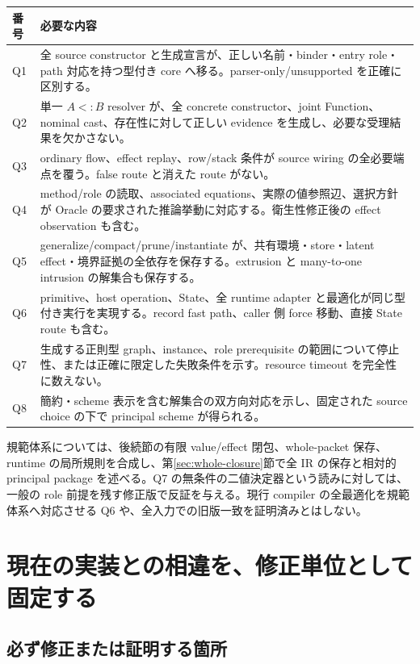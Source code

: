 \documentclass[11pt,a4paper]{article}
\theoremstyle{remark}
\begin{document}
\begin{longtable}{p{}p{}}
\toprule
番号 & 必要な内容 \\
\midrule\endhead
Q1 & 全 source constructor と生成宣言が、正しい名前・binder・entry role・path 対応を持つ型付き core へ移る。parser-only/unsupported を正確に区別する。\\
Q2 & 単一 $A<:B$ resolver が、全 concrete constructor、joint Function、nominal cast、存在性に対して正しい evidence を生成し、必要な受理結果を欠かさない。\\
Q3 & ordinary flow、effect replay、row/stack 条件が source wiring の全必要端点を覆う。false route と消えた route がない。\\
Q4 & method/role の読取、associated equations、実際の値参照辺、選択方針が Oracle の要求された推論挙動に対応する。衛生性修正後の effect observation も含む。\\
Q5 & generalize/compact/prune/instantiate が、共有環境・store・latent effect・境界証拠の全依存を保存する。extrusion と many-to-one intrusion の解集合も保存する。\\
Q6 & primitive、host operation、State、全 runtime adapter と最適化が同じ型付き実行を実現する。record fast path、caller 側 force 移動、直接 State route も含む。\\
Q7 & 生成する正則型 graph、instance、role prerequisite の範囲について停止性、または正確に限定した失敗条件を示す。resource timeout を完全性に数えない。\\
Q8 & 簡約・scheme 表示を含む解集合の双方向対応を示し、固定された source choice の下で principal scheme が得られる。\\
\bottomrule
\end{longtable}

規範体系については、後続節の有限 value/effect 閉包、whole-packet 保存、runtime の局所規則を合成し、第\ref{sec:whole-closure}節で全 IR の保存と相対的 principal package を述べる。Q7 の無条件の二値決定器という読みに対しては、一般の role 前提を残す修正版で反証を与える。現行 compiler の全最適化を規範体系へ対応させる Q6 や、全入力での旧版一致を証明済みとはしない。

\section{現在の実装との相違を、修正単位として固定する}

\subsection{必ず修正または証明する箇所}
\end{document}
